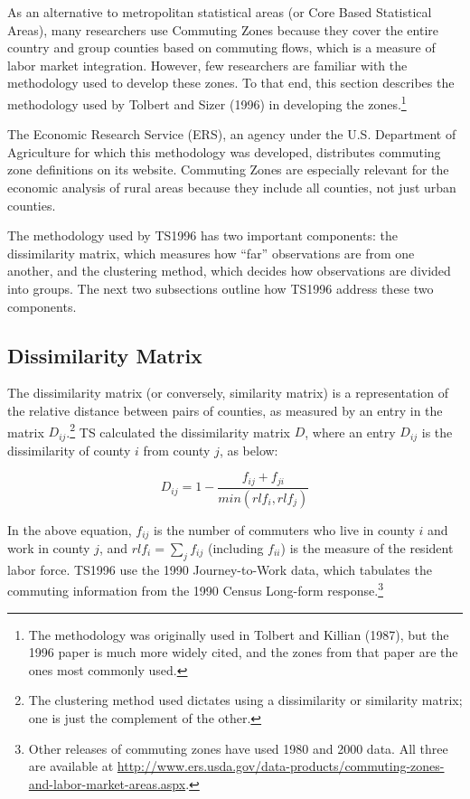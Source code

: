 As an alternative to metropolitan statistical areas (or Core Based Statistical Areas), many researchers use
Commuting Zones because they cover the entire country and group counties based on commuting flows, which is a
measure of labor market integration. However, few researchers are familiar with the methodology used to develop
these zones. To that end, this section describes the methodology used by Tolbert and Sizer (1996) in
developing the zones.\footnote{The methodology was originally used in Tolbert and Killian (1987), but the 1996
paper is much more widely cited, and the zones from that paper are the ones most commonly used.}

The Economic Research Service (ERS), an agency under the U.S. Department of Agriculture for which this
methodology was developed, distributes commuting zone definitions on its website. Commuting Zones are
especially relevant for the economic analysis of rural areas because they include all counties, not just urban
counties.

The methodology used by TS1996 has two important components: the dissimilarity matrix, which measures how ``far'' observations are from one another, and the clustering method, which decides how observations are divided into groups. The next two subsections outline how TS1996 address these two components.

\subsection{Dissimilarity Matrix}

The dissimilarity matrix (or conversely, similarity matrix) is a representation of the relative distance between pairs of counties, as measured by an entry in the matrix $D_{ij}$.\footnote{The clustering method used dictates using a dissimilarity or similarity matrix; one is just the complement of the other.} TS calculated the dissimilarity matrix $D$, where an entry $D_{ij}$ is the dissimilarity of county $i$ from county $j$, as below:

\begin{equation}\label{eqn:diss}
D_{ij} = 1- \frac{f_{ij}+f_{ji}}{min(rlf_{i},rlf_j)}
\end{equation}

In the above equation, $f_{ij}$ is the number of commuters who live in county $i$ and work in county $j$, and $rlf_i = \sum_j f_{ij}$ (including $f_{ii}$) is the measure of the resident labor force. TS1996 use the 1990 Journey-to-Work data, which tabulates the commuting information from the 1990 Census Long-form response.\footnote{Other releases of commuting zones have used 1980 and 2000 data. All three are available at \url{http://www.ers.usda.gov/data-products/commuting-zones-and-labor-market-areas.aspx}.}

